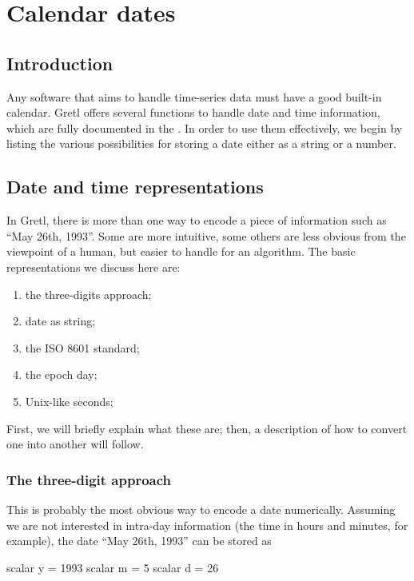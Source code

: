 \chapter{Calendar dates}
\label{chap:calendar}

\section{Introduction}
\label{sec:cal-intro}

Any software that aims to handle time-series data must have a good
built-in calendar. Gretl offers several functions to handle date and
time information, which are fully documented in the \GCR{}. In order
to use them effectively, we begin by listing the various possibilities
for storing a date either as a string or a number.

\section{Date and time representations}
\label{sec:cal-representations}

In Gretl, there is more than one way to encode a piece of information
such as ``May 26th, 1993''. Some are more intuitive, some others are
less obvious from the viewpoint of a human, but easier to handle for
an algorithm. The basic representations we discuss here are:
\begin{enumerate}
\item the three-digits approach;
\item date as string;
\item the ISO 8601 standard;
\item the epoch day;
\item Unix-like seconds;
\end{enumerate}
First, we will briefly explain what these are; then, a description of
how to convert one into another will follow.

\subsection{The three-digit approach}
\label{sec:cal-3digits}

This is probably the most obvious way to encode a date
numerically. Assuming we are not interested in intra-day information
(the time in hours and minutes, for example), the date ``May 26th,
1993'' can be stored as
\begin{code}
  scalar y = 1993
  scalar m = 5
  scalar d = 26
\end{code}

